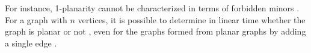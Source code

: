 \documentclass[12pt]{article}
\begin{document}
 For instance, 1-planarity cannot be characterized in 
terms of forbidden minors \cite{grigoriev2007algorithms}. 
For a graph with $n$ vertices, it is possible to determine in linear time 
whether the graph is planar or not \cite{hopcroft1974efficient}, even for the 
graphs formed from planar graphs 
by adding a single edge \cite{korzhik2013minimal}. 



\end{document}
